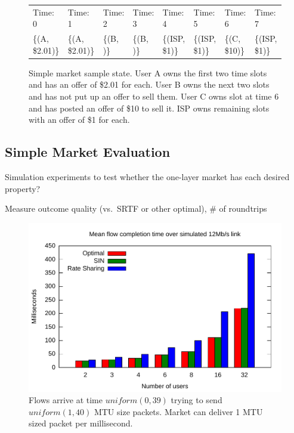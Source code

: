 \begin{figure}

\newlength{\slotwidth}
\setlength{\slotwidth}{.103\textwidth}

\renewcommand{\arraystretch}{2}
\begin{tabular}[height=3in]{|p{\slotwidth}|p{\slotwidth}|p{\slotwidth}|p{\slotwidth}|p{\slotwidth}|p{\slotwidth}|p{\slotwidth}|p{\slotwidth}|}
\hline
Time: 0 & Time: 1 & Time: 2 & Time: 3 & Time: 4 & Time: 5 & Time: 6 & Time: 7 \\
\{(A, \$2.01)\} & \{(A, \$2.01)\} & \{(B, )\} & \{(B, )\} & \{(ISP, \$1)\} & \{(ISP, \$1)\} & \{(C, \$10)\} & \{(ISP, \$1)\} \\
\hline
\end{tabular}
\caption{Simple market sample state. User A owns the first two time slots and has an offer of \$2.01 for each. User B owns the next two slots and has not put up an offer to sell them. User C owns slot at time 6 and has posted an offer of \$10 to sell it. ISP owns remaining slots with an offer of \$1 for each.}
\label{f:simple_market}
\end{figure}

\subsection{Simple Market Evaluation}

Simulation experiments to test whether the one-layer market has each desired property?

Measure outcome quality (vs.~SRTF or other optimal), \# of roundtrips

\begin{figure}
\includegraphics[width=\columnwidth]{plots/delay_over_srtf.pdf}
\caption{Flows arrive at time $uniform(0, 39)$ trying to send $uniform(1, 40)$ MTU size packets. Market can deliver 1 MTU sized packet per millisecond.}
\label{f:delay_over_srtf}
\end{figure}


